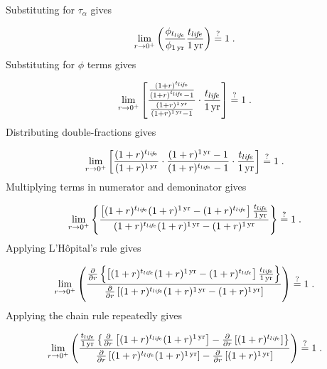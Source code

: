 Substituting for $\tau_\alpha$ gives

\begin{equation}
  \lim_{r \to 0^+} \left( \frac{\phi_{t_{li\!f\!e}}}{\phi_{1\,\mathrm{yr}}} \frac{t_{li\!f\!e}}{1\,\mathrm{yr}} \right) 
  \stackrel{?}{=} 1 \; .
\end{equation}
%
Substituting for $\phi$ terms gives

\begin{equation}
  \lim_{r \to 0^+} \left[ \frac{\frac{(1 + r)^{t_{li\!f\!e}}}{(1 + r)^{t_{li\!f\!e}} - 1}}{\frac{(1 + r)^{1\,\mathrm{yr}}}{(1 + r)^{1\,\mathrm{yr}} - 1}} \cdot \frac{t_{li\!f\!e}}{1\,\mathrm{yr}} \right] \stackrel{?}{=} 1 \; .
\end{equation}
%
Distributing double-fractions gives

\begin{equation}
  \lim_{r \to 0^+} \left[
  \frac{(1 + r)^{t_{li\!f\!e}}}{(1 + r)^{1\,\mathrm{yr}}} \cdot
  \frac{(1 + r)^{1\,\mathrm{yr}} - 1}{(1 + r)^{t_{li\!f\!e}} - 1} \cdot
  \frac{t_{li\!f\!e}}{1\,\mathrm{yr}}
  \right] \stackrel{?}{=} 1 \; .
\end{equation}
%
Multiplying terms in numerator and demoninator gives

\begin{equation}
  \lim_{r \to 0^+} \left\{
  \frac{\left[(1 + r)^{\tlife} (1 + r)^{\oneyr} - (1 + r)^{\tlife} \right] \frac{\tlife}{\oneyr}}{(1 + r)^{\tlife} (1 + r)^{\oneyr} - (1 + r)^{\oneyr}}
  \right\} \questionequal 1 \; .
\end{equation}
%
Applying L'H\^{o}pital's rule gives

\begin{equation}
  \lim_{r \to 0^+} \left(
  \frac{\frac{\partial}{\partial r} \left\{ \left[(1 + r)^{\tlife} (1 + r)^{\oneyr} - (1 + r)^{\tlife} \right] \frac{\tlife}{\oneyr} \right\}}
  {\frac{\partial}{\partial r} \left[ (1 + r)^{\tlife} (1 + r)^{\oneyr} - (1 + r)^{\oneyr}\right]}
  \right) \questionequal 1 \; .
\end{equation}
%
Applying the chain rule repeatedly gives

\begin{equation}
  \lim_{r \to 0^+} \left(
  \frac{\frac{\tlife}{\oneyr} 
      \left\{ \frac{\partial}{\partial r} \left[  (1 + r)^{\tlife} (1 + r)^{\oneyr} \right]  - 
              \frac{\partial}{\partial r} \left[  (1 + r)^{\tlife} \right] 
      \right\}}
  {\frac{\partial}{\partial r} \left[    (1 + r)^{\tlife} (1 + r)^{\oneyr} \right]  - 
              \frac{\partial}{\partial r} \left[  (1 + r)^{\oneyr} \right] }
  \right) \questionequal 1 \; .
\end{equation}

